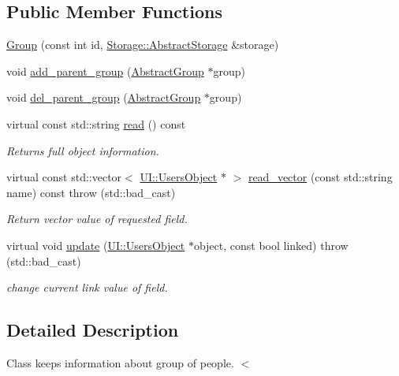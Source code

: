 \subsection*{Public Member Functions}
\begin{DoxyCompactItemize}
\item 
\hyperlink{classCore_1_1Group_a39511a091570283cb5fb2a4b8f0a841a}{Group} (const int id, \hyperlink{classStorage_1_1AbstractStorage}{Storage::AbstractStorage} \&storage)
\item 
void \hyperlink{classCore_1_1Group_a05760e4e45ae6fec2674d216f0a5a6e9}{add\_\-parent\_\-group} (\hyperlink{classCore_1_1AbstractGroup}{AbstractGroup} $\ast$group)
\item 
void \hyperlink{classCore_1_1Group_a93e4626dde0f84e68f1460e557daaed0}{del\_\-parent\_\-group} (\hyperlink{classCore_1_1AbstractGroup}{AbstractGroup} $\ast$group)
\item 
virtual const std::string \hyperlink{classCore_1_1Group_a5fe3fef1b6709f953e5487841d90bbb9}{read} () const 
\begin{DoxyCompactList}\small\item\em Returns full object information. \item\end{DoxyCompactList}\item 
virtual const std::vector$<$ \hyperlink{classUI_1_1UsersObject}{UI::UsersObject} $\ast$ $>$ \hyperlink{classCore_1_1Group_a52e48b1f92f6354b4e3a32d710b9c7b3}{read\_\-vector} (const std::string name) const   throw (std::bad\_\-cast)
\begin{DoxyCompactList}\small\item\em Return vector value of requested field. \item\end{DoxyCompactList}\item 
virtual void \hyperlink{classCore_1_1Group_a12d2636d65f1baea3666bb492320b5c1}{update} (\hyperlink{classUI_1_1UsersObject}{UI::UsersObject} $\ast$object, const bool linked)  throw (std::bad\_\-cast)
\begin{DoxyCompactList}\small\item\em change current link value of field. \item\end{DoxyCompactList}\end{DoxyCompactItemize}


\subsection{Detailed Description}
Class keeps information about group of people. $<$ 

